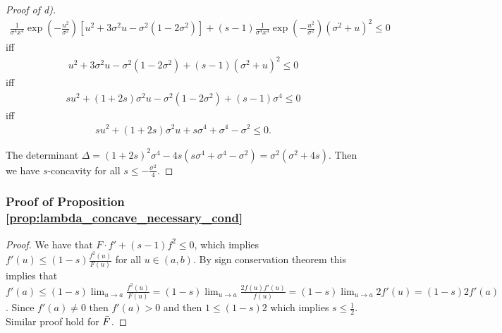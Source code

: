 \documentclass{article} %
\begin{document}
\begin{proof}[Proof of d)]
\begin{align*}
\frac{1}{\sigma^4 x^4}\exp \left(-\frac{u^2}{ \sigma^2}\right) \left[u^2+3\sigma^2 u -\sigma^2(1-2\sigma^2) \right] + (s -1)\frac{1}{\sigma^4x^4}\exp \left(-\frac{u^2}{ \sigma^2}\right) (\sigma^2 + u)^2 \leq 0
\end{align*}
iff
\begin{align*}
u^2+3\sigma^2 u -\sigma^2(1-2\sigma^2)+ (s -1)(\sigma^2 + u)^2 \leq 0
\end{align*}
iff
\begin{align*}
s u^2+(1 +2s)\sigma^2u -\sigma^2(1-2\sigma^2)+ (s -1)\sigma^4\leq 0
\end{align*}
iff
\begin{align*}
s u^2+(1 +2s)\sigma^2u +s\sigma^4+\sigma^4-\sigma^2\leq 0.
\end{align*}

The determinant $\Delta = (1 +2s)^2\sigma^4-4s(s\sigma^4+\sigma^4-\sigma^2)=\sigma^2(\sigma^2+4s)$. Then we have $s$-concavity for all $s \leq -\frac{\sigma^2}{4}$.

\end{proof}

\subsubsection{Proof of Proposition \ref{prop:lambda_concave_necessary_cond}}\label{proof-prop:lambda_concave_necess_cond}
\begin{proof}

We have that $F \cdot f'+(s-1)f^2 \leq 0$, which implies $f'(u) \leq (1-s) \frac{f^2(u)}{F(u)}$ for all $u \in (a,b)$. By sign conservation theorem this implies that $f'(a) \leq (1-s) \lim_{u \rightarrow a}\frac{f^2(u)}{F(u)}=(1-s) \lim_{u \rightarrow a}\frac{2f(u)f'(u)}{f(u)} = (1-s) \lim_{u \rightarrow a}2f'(u) = (1-s)2f'(a)$. Since $f'(a) \neq 0$ then $f'(a)>0$ and then $1\leq (1-s)2$ which implies $s \leq \frac{1}{2}$. Similar proof hold for $\Bar{F}$.

\end{proof}
\end{document}
